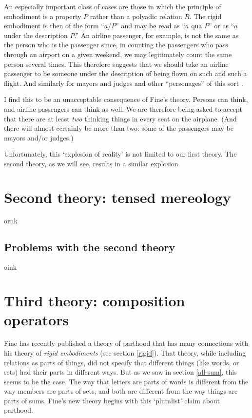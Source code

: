 \documentclass[11pt]{article}
\newenvironment{squote}{%
\begin{spacing}{1}
\begin{list}{}{%
\setlength{\labelwidth}{0pt}%
\rightmargin\leftmargin%
}
\item\relax
}{%
\end{list}%
\end{spacing}
}
\begin{document}
\begin{spacing}{1.5}
\begin{squote}
An especially important class of cases are those in which the
principle of embodiment is a property $P$ rather than a polyadic
relation $R$.  The rigid embodiment is then of the form ``$a/P$'' and
may be read as ``$a$ qua $P$'' or as ``$a$ under the description
$P$.''  An airline passenger, for example, is not the same as the
person who is the passenger since, in counting the passengers who pass
through an airport on a given weekend, we may legitimately count the
same person several times.  This therefore suggests that we should
take an airline passenger to be someone under the description of being
flown on such and such a flight.  And similarly for mayors and judges
and other ``personages'' of this sort \citeyearpar[67--68]{fine1999}.
\end{squote}

I find this to be an unacceptable consequence of Fine's theory.
Persons can think, and airline passengers can think as well.  We are
therefore being asked to accept that there are at least {\em two}
thinking things in every seat on the airplane.  (And there will almost
certainly be more than two: some of the passengers may be mayors
and/or judges.)

Unfortunately, this `explosion of reality' is not limited to our first
theory.  The second theory, as we will see, results in a similar
explosion.

\section{Second theory: tensed mereology}
\label{hovda}
ornk

\subsection{Problems with the second theory}
\label{problems2}
oink

\section{Third theory: composition operators}
\label{fine-c}
Fine has recently published a theory of parthood that has many
connections with his theory of {\em rigid embodiments} (see section
\ref{rigid}).  That theory, while including relations as parts of
things, did not specify that different things (like words, or sets)
had their parts in different ways.  But as we saw in section
\ref{all-sum}, this seems to be the case.  The way that letters are
parts of words is different from the way members are parts of sets,
and both are different from the way things are parts of sums.  Fine's
new theory begins with this `pluralist' claim about parthood.


\end{spacing}
\end{document}
